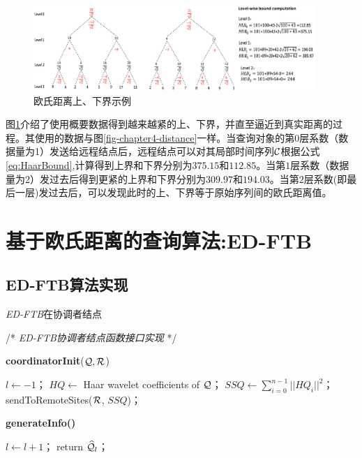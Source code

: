 \begin{figure}
	\centering
	\includegraphics[width=0.95\textwidth]{Fig/chapter4/bound}
	\caption{欧氏距离上、下界示例}
	\label{fig-chapter4-bound}
\end{figure}

图\ref{fig-chapter4-bound}介绍了使用概要数据得到越来越紧的上、下界，并直至逼近到真实距离的过程。其使用的数据与图\ref{fig-chapter4-distance}一样。当查询对象的第$0$层系数（数据量为1）发送给远程结点后，远程结点可以对其局部时间序列$\cal C$根据公式\ref{eq:HaarBound},计算得到上界和下界分别为$375.15$和$112.85$。当第$1$层系数（数据量为2）发过去后得到更紧的上界和下界分别为$309.97$和$194.03$。当第$2$层系数(即最后一层)发过去后，可以发现此时的上、下界等于原始序列间的欧氏距离值。

 \section{基于欧氏距离的查询算法:ED-FTB}\label{sec-c4-algorithm}
 \subsection{ED-FTB算法实现}
\begin{algorithm}[t]
	\renewcommand{\baselinestretch}{1}
	\caption{{\sl ED-FTB}\label{alg:EDCoordinator}在协调者结点}
	\begin{algorithmic}[2]
		\STATE /* \emph{ED-FTB协调者结点函数接口实现} */
	\end{algorithmic}
	\textbf{coordinatorInit}(${\cal Q} ,  {\cal R}$)
	\begin{algorithmic}[1]
		\STATE  $l\leftarrow -1$；
		\STATE $HQ \leftarrow$ Haar wavelet coefficients of $\cal Q$；
		\STATE $SSQ \leftarrow \sum_{i=0}^{n-1}||HQ_{i}||^2$；
		\STATE 	\textsf{sendToRemoteSites}(${\cal R}$, $SSQ$)；
	\end{algorithmic}
	
	\textbf{generateInfo()}
	\begin{algorithmic}[1]
		\STATE $l\leftarrow l+1$；
		\STATE return $\widehat {\cal Q}_{l}$；
	\end{algorithmic}
\end{algorithm}


